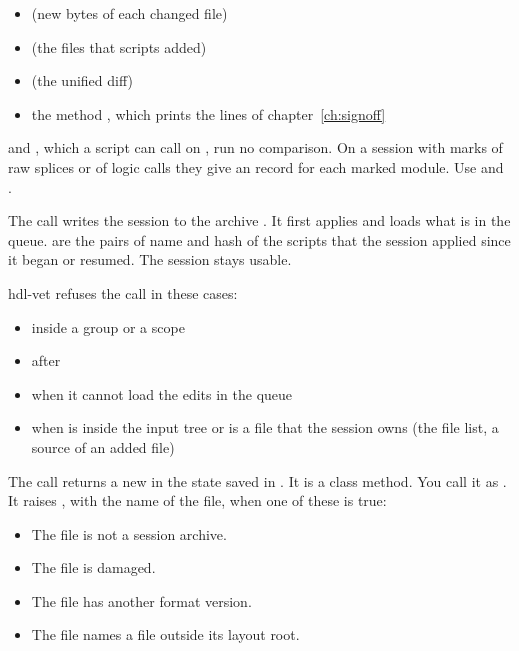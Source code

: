 \begin{entry}{}
\begin{itemize}
  \item {} (new bytes of each changed file)
  \item {} (the files that scripts added)
  \item {} (the unified diff)
  \item the method , which prints the lines of chapter~\ref{ch:signoff}
  \end{itemize}
   and , which a script can call on ,
  run no comparison. On a session with marks of raw splices or of logic calls they give an 
  record for each marked module. Use  and .
\end{entry}

\begin{entry}{}
\item[Writes] The call writes the session to the archive . It first applies
  and loads what is in the queue.  are the pairs of name and hash of the
  scripts that the session applied since it began or resumed. The session stays usable.
\item[Refused] hdl-vet refuses the call in these cases:
  \begin{itemize}
  \item inside a group or a scope
  \item after 
  \item when it cannot load the edits in the queue
  \item when  is inside the input tree or is a file that the session owns (the
    file list, a source of an added file)
  \end{itemize}
\end{entry}

\begin{entry}{}
\item[Returns] The call returns a new  in the state saved in . It is
  a class method. You call it as . It raises ,
  with the name of the file, when one of these is true:
  \begin{itemize}
  \item The file is not a session archive.
  \item The file is damaged.
  \item The file has another format version.
  \item The file names a file outside its layout root.
  \end{itemize}
\end{entry}

